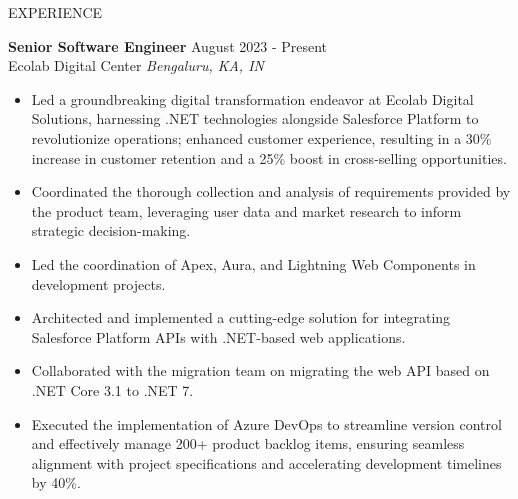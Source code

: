 \documentclass[11pt]{resume}
\begin{document}
    \begin{rSection}{EXPERIENCE}

        \textbf{Senior Software Engineer} \hfill August 2023 - Present\\
        Ecolab Digital Center \hfill \textit{Bengaluru, KA, IN}
        \begin{itemize}
            \itemsep -3pt {}
            \item Led a groundbreaking digital transformation endeavor at Ecolab Digital Solutions, harnessing .NET technologies alongside Salesforce Platform to revolutionize operations; enhanced customer experience, resulting in a 30\% increase in customer retention and a 25\% boost in cross-selling opportunities.
            \item Coordinated the thorough collection and analysis of requirements provided by the product team, leveraging user data and market research to inform strategic decision-making.
            \item Led the coordination of Apex, Aura, and Lightning Web Components in development projects.
            \item Architected and implemented a cutting-edge solution for integrating Salesforce Platform APIs with .NET-based web applications.
            \item Collaborated with the migration team on migrating the web API based on .NET Core 3.1 to .NET 7.
            \item Executed the implementation of Azure DevOps to streamline version control and effectively manage 200+ product backlog items, ensuring seamless alignment with project specifications and accelerating development timelines by 40\%.
        \end{itemize} \hfill \newline


\end{rSection}
\end{document}
